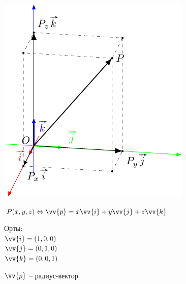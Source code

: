 \documentclass[10pt]{beamer}
\begin{document}
{
	{
		
		\includegraphics{pointinspace.pdf}
		
	}
	{
		$P(x,y,z) \Leftrightarrow \vv{p}=x\vv{i} + y\vv{j} + z\vv{k} $
		
		\hfill
		
		Орты:\\
		$\vv{i}=(1,0,0)$\\
		$\vv{j}=(0,1,0)$\\
		$\vv{k}=(0,0,1)$
		
		\hfill
		
		$\vv{p}$ -- радиус-вектор	
		 
		
		
	}
}
\end{document}

